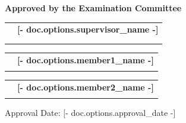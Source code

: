 \documentclass[a4paper,11pt,oneside]{article}
\begin{document}
\begin{center}
  {\fontsize{12pt}{14pt}\selectfont \bfseries Approved by the Examination Committee}
\end{center}

\vspace{1.5cm}

\begin{tabular}{p{5cm} p{10cm}}
  {\fontsize{12pt}{14pt}\selectfont {Supervisor}} &
  {\fontsize{12pt}{14pt}\selectfont \textbf{[- doc.options.supervisor_name -]}} \\
  & {\fontsize{12pt}{14pt}} \\
  & {\fontsize{12pt}{14pt}} \\
\end{tabular}

\vspace{1.2cm}

\begin{tabular}{p{5cm} p{10cm}}
  {\fontsize{12pt}{14pt}\selectfont {Member}} &
  {\fontsize{12pt}{14pt}\selectfont \textbf{[- doc.options.member1_name -]}} \\
  & {\fontsize{12pt}{14pt}} \\
\end{tabular}

\vspace{1.2cm}

\begin{tabular}{p{5cm} p{10cm}}
  {\fontsize{12pt}{14pt}\selectfont {Member}} &
  {\fontsize{12pt}{14pt}\selectfont \textbf{[- doc.options.member2_name -]}} \\
  & {\fontsize{12pt}{14pt}} \\
\end{tabular}

\vspace{2cm} %

\noindent
{\fontsize{12pt}{14pt}\selectfont Approval Date: [- doc.options.approval_date -]}

\clearpage

\clearpage
\thispagestyle{empty}

\vspace*{2cm} %
\\[0.6cm]
\end{document}
